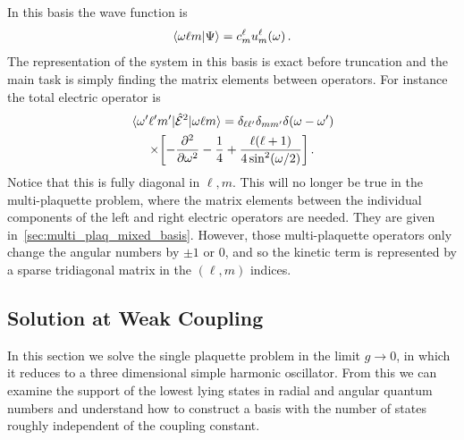 \documentclass[reprint,superscriptaddress,pra,nofootinbib,preprintnumbers,floatfix]{revtex4-1}
\begin{document}
In this basis the wave function is
%
\begin{equation}
    \braket{\omega \ell m}{\Psi} = c^{\ell}_m u^\ell_m(\omega) \,.
\end{equation}
%
The representation of the system in this basis is exact before truncation and the main task is simply finding the matrix elements between operators.
%
For instance the total electric operator is
%
\begin{multline}\label{eq:Etot_matrix_elements}
\mel{\omega' \ell' m'}{\hat{\mathcal{E}}^2}{\omega \ell m}
= \delta_{\ell\ell'} \delta_{mm'} \delta(\omega-\omega') \\
\times \bqty{-\pdv[2]{\omega} - \frac{1}{4} + \frac{\ell(\ell+1)}{4\sin^2(\omega/2)}} \,.
\end{multline}
%
Notice that this is fully diagonal in $\ell,m$. 
%
This will no longer be true in the multi-plaquette problem, where the matrix elements between the individual components of the left and right electric operators are needed. 
%
They are given in~\cref{sec:multi_plaq_mixed_basis}.
%
However, those multi-plaquette operators only change the angular numbers by $\pm 1$ or 0, and so the kinetic term is represented by a sparse tridiagonal matrix in the $(\ell,m)$ indices.



\subsection{Solution at Weak Coupling}

In this section we solve the single plaquette problem in the limit $g \to 0$, in which it reduces to a three dimensional simple harmonic oscillator. 
%
From this we can examine the support of the lowest lying states in radial and angular quantum numbers and understand how to construct a basis with the number of states roughly independent of the coupling constant.
\end{document}
